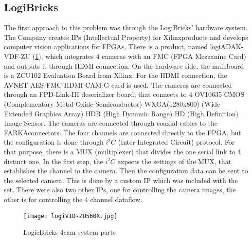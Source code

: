 \subsection{LogiBricks} \label{sec:logibricks} %
The first approach to this problem was through the LogiBricks'\texttrademark \cite{Logibricks} hardware system.
The Company creates IPs (Intellectual Property) for Xilinx\texttrademark products and develops computer vision applications for FPGAs.
There is a product, named logiADAK-VDF-ZU\texttrademark \cite{logiVID-ZU} (\cref{fig:logic_4cam}), which integrates 4 cameras with an FMC (FPGA Mezzanine Card) and outputs it through HDMI connection.
On the hardware side, the mainboard is a ZCU102 Evaluation Board \cite{ZCU102} from Xilinx.
For the HDMI connection, the AVNET \cite{AvNet} AES-FMC-HDMI-CAM-G card is used.
The cameras are connected through an FPD-Link-III deserializer board, that connects to 4 OV10635 \cite{Omnivision} CMOS (Complementary Metal-Oxide-Semiconductor) WXGA(1280x800) (Wide Extended Graphics Array) HDR (High Dynamic Range) HD (High Definition) Image Sensor.
The cameras are connected through coaxial cables to the FARKA\texttrademark connectors.
The four channels are connected directly to the FPGA, but the configuration is done through $i^2C$ (Inter-Integrated Circuit) protocol.
For that purpose, there is a MUX (multiplexer) that divides the one serial link to 4 distinct one.
In the first step, the $i^2C$ expects the settings of the MUX, that establishes the channel to the camera.
Then the configuration data can be sent to the selected camera.
This is done by a custom IP which was included with the set.
There were also two other IPs, one for controlling the camera images, the other is for controlling the 4 channel dataflow.
\begin{figure}
    \centering
    \texttt{[image: logiVID-ZU560X.jpg]}
    \caption{LogicBricks 4cam system parts \cite{logi_4cam_img}}
    \label{fig:logic_4cam}
\end{figure}

